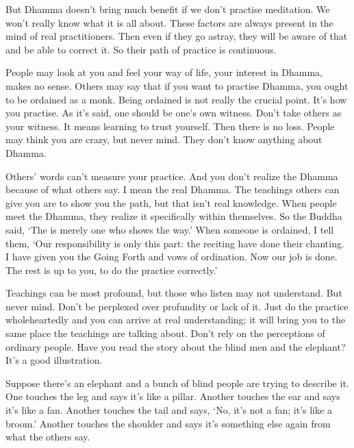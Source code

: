 But Dhamma doesn't bring much benefit if we don't practise meditation. We won't really know what it is all about. These factors are always present in the mind of real practitioners. Then even if they go astray, they will be aware of that and be able to correct it. So their path of practice is continuous.

People may look at you and feel your way of life, your interest in Dhamma, makes no sense. Others may say that if you want to practise Dhamma, you ought to be ordained as a monk. Being ordained is not really the crucial point. It's how you practise. As it's said, one should be one's own witness. Don't take others as your witness. It means learning to trust yourself. Then there is no loss. People may think you are crazy, but never mind. They don't know anything about Dhamma.

Others' words can't measure your practice. And you don't realize the Dhamma because of what others say. I mean the real Dhamma. The teachings others can give you are to show you the path, but that isn't real knowledge. When people meet the Dhamma, they realize it specifically within themselves. So the Buddha said, `The  is merely one who shows the way.' When someone is ordained, I tell them, `Our responsibility is only this  part: the reciting  have done their chanting. I have given you the Going Forth and vows of ordination. Now our job is done. The rest is up to you, to do the practice correctly.'

Teachings can be most profound, but those who listen may not understand. But never mind. Don't be perplexed over profundity or lack of it. Just do the practice wholeheartedly and you can arrive at real understanding; it will bring you to the same place the teachings are talking about. Don't rely on the perceptions of ordinary people. Have you read the story about the blind men and the elephant? It's a good illustration.

Suppose there's an elephant and a bunch of blind people are trying to describe it. One touches the leg and says it's like a pillar. Another touches the ear and says it's like a fan. Another touches the tail and says, `No, it's not a fan; it's like a broom.' Another touches the shoulder and says it's something else again from what the others say.

